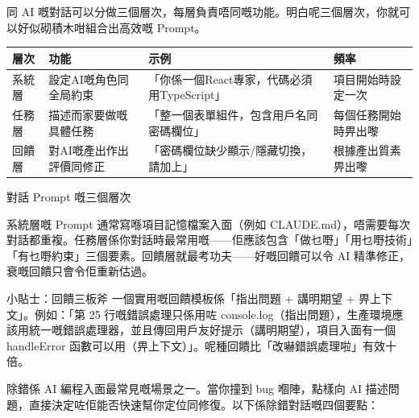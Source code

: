 


同 AI 嘅對話可以分做三個層次，每層負責唔同嘅功能。明白呢三個層次，你就可以好似砌積木咁組合出高效嘅 Prompt。

\begin{center}
\begin{tabularx}{\linewidth}{|X|X|X|X|}
\hline
\textbf{層次} & \textbf{功能} & \textbf{示例} & \textbf{頻率} \tabularnewline
\hline
系統層 & 設定AI嘅角色同全局約束 & 「你係一個React專家，代碼必須用TypeScript」 & 項目開始時設定一次 \tabularnewline
任務層 & 描述而家要做嘅具體任務 & 「整一個表單組件，包含用戶名同密碼欄位」 & 每個任務開始時畀出嚟 \tabularnewline
回饋層 & 對AI嘅產出作出評價同修正 & 「密碼欄位缺少顯示/隱藏切換，請加上」 & 根據產出質素畀出嚟 \tabularnewline
\hline
\end{tabularx}
\end{center}

\begin{center}\small\color{gray}對話 Prompt 嘅三個層次\end{center}

系統層嘅 Prompt 通常寫喺項目記憶檔案入面（例如 CLAUDE.md），唔需要每次對話都重複。任務層係你對話時最常用嘅——佢應該包含「做乜嘢」「用乜嘢技術」「有乜嘢約束」三個要素。回饋層就最考功夫——好嘅回饋可以令 AI 精準修正，衰嘅回饋只會令佢重新估過。

\begin{tcbinfo}{小貼士：回饋三板斧}
一個實用嘅回饋模板係「指出問題 + 講明期望 + 畀上下文」。例如：「第 25 行嘅錯誤處理只係用咗 console.log（指出問題），生產環境應該用統一嘅錯誤處理器，並且傳回用戶友好提示（講明期望），項目入面有一個 handleError 函數可以用（畀上下文）」。呢種回饋比「改嚇錯誤處理啦」有效十倍。

\end{tcbinfo}


除錯係 AI 編程入面最常見嘅場景之一。當你撞到 bug 嗰陣，點樣向 AI 描述問題，直接決定咗佢能否快速幫你定位同修復。以下係除錯對話嘅四個要點：

